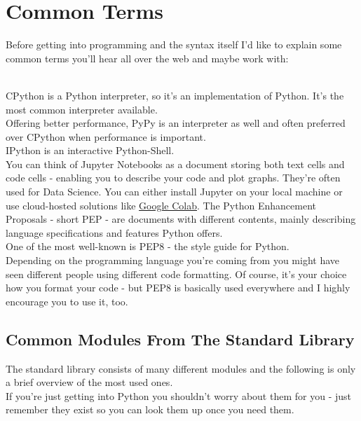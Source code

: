 \section{Common Terms}
    Before getting into programming and the syntax itself I'd like to explain some common terms you'll hear all over the web and maybe work with:
    \begin{enumerate}
        \\
            CPython is a Python interpreter, so it's an implementation of Python.
            It's the most common interpreter available.
        \\
            Offering better performance, PyPy is an interpreter as well and often preferred over CPython when performance is important.
        \\
            IPython is an interactive Python-Shell.
        \\
            You can think of Jupyter Notebooks as a document storing both text cells and code cells - enabling you to describe your code and plot graphs. They're often used for Data Science.
            You can either install Jupyter on your local machine or use cloud-hosted solutions like \href{https://colab.research.google.com/}{Google Colab}.
            The Python Enhancement Proposals - short PEP - are documents with different contents, mainly describing language specifications and features Python offers.\\
            One of the most well-known is PEP8 - the style guide for Python.\\
            Depending on the programming language you're coming from you might have seen different people using different code formatting.
            Of course, it's your choice how you format your code - but PEP8 is basically used everywhere and I highly encourage you to use it, too.
        \end{enumerate}
        
    \subsection{Common Modules From The Standard Library}
        The standard library consists of many different modules and the following is only a brief overview of the most used ones.\\
        If you're just getting into Python you shouldn't worry about them for you - just remember they exist so you can look them up once you need them.
        
